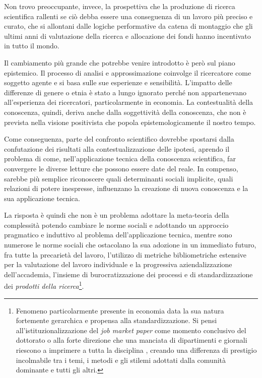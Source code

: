 \documentclass[a4paper, headings=standardclasses]{scrartcl}
\begin{document}
Non trovo preoccupante, invece, la prospettiva che la produzione di ricerca scientifica rallenti se ciò debba essere una conseguenza di un lavoro più preciso e curato, che si allontani dalle logiche performative da catena di montaggio che gli ultimi anni di valutazione della ricerca e allocazione dei fondi hanno incentivato in tutto il mondo.

Il cambiamento più grande che potrebbe venire introdotto è però sul piano epistemico.
Il processo di analisi e approssimazione coinvolge il ricercatore come soggetto agente e si basa sulle sue esperienze e sensibilità.
L'impatto delle differenze di genere o etnia è stato a lungo ignorato perché non appartenevano all'esperienza dei ricercatori, particolarmente in economia.
La contestualità della conoscenza, quindi, deriva anche dalla soggettività della conoscenza, che non è prevista nella visione positivista che popola epistemologicamente il nostro tempo.

Come conseguenza, parte del confronto scientifico dovrebbe spostarsi dalla confutazione dei risultati alla contestualizzazione delle ipotesi, aprendo il problema di come, nell'applicazione tecnica della conoscenza scientifica, far convergere le diverse letture che possono essere date del reale.
In compenso, sarebbe più semplice riconoscere quali determinanti sociali implicite, quali relazioni di potere inespresse, influenzano la creazione di nuova conoscenza e la sua applicazione tecnica.

La risposta è quindi che non è un problema adottare la meta-teoria della complessità potendo cambiare le norme sociali e adottando un approccio pragmatico e induttivo al problema dell'applicazione tecnica, mentre sono numerose le norme sociali che ostacolano la sua adozione in un immediato futuro, fra tutte la precarietà del lavoro, l'utilizzo di metriche bibliometriche estensive per la valutazione del lavoro individuale e la progressiva aziendalizzazione dell'accademia, l'insieme di burocratizzazione dei processi e di standardizzazione dei \textit{prodotti della ricerca}\footnote{Fenomeno particolarmente presente in economia data la sua natura fortemente gerarchica e propensa alla standardizzazione. Si pensi all'istituzionalizzazione del \textit{job market paper} come momento conclusivo del dottorato o alla forte direzione che una manciata di dipartimenti e giornali riescono a imprimere a tutta la disciplina \parencite{heckman2020, aistleitner2023, baccini2023a}, creando una differenza di prestigio incolmabile tra i temi, i metodi e gli stilemi adottati dalla comunità dominante e tutti gli altri.}.
\end{document}
